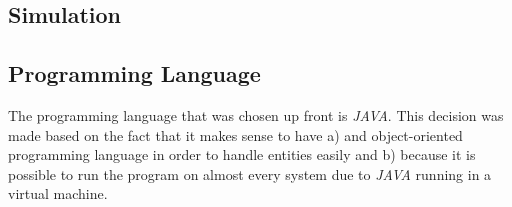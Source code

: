 \subsection{Simulation}
\subsection{Programming Language}\label{subsec:programming-language}
The programming language that was chosen up front is \textit{JAVA}.
This decision was made based on the fact that it makes sense to have a) and object-oriented programming language in order to
handle entities easily and b) because it is possible to run the program on almost every system due to \textit{JAVA} running
in a virtual machine.



